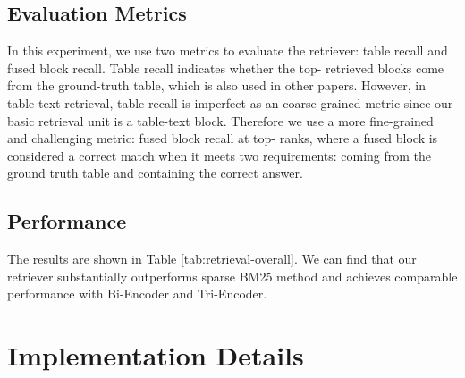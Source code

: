 \documentclass[11pt]{article}
\begin{document}
\subsection{Evaluation Metrics}
In this experiment, we use two metrics to evaluate the retriever: table recall and fused block recall. 
Table recall indicates whether the top- retrieved blocks come from the ground-truth table, which is also used in other papers.
However, in table-text retrieval, table recall is imperfect as an coarse-grained metric since our basic retrieval unit is a table-text block.
Therefore we use a more fine-grained and challenging  metric:  fused  block  recall  at top- ranks, where a fused block is considered a correct match when it meets two requirements: coming from the ground truth table and containing the correct answer. 

\subsection{Performance}
The results are shown in Table \ref{tab:retrieval-overall}. We can find that our retriever substantially outperforms sparse BM25 method and achieves comparable performance with Bi-Encoder and Tri-Encoder.




\begin{table}[htbp]
\small
  \centering
  \caption{Overall retrieval results on OTT-QA dev set. Table recalls and fused block recalls are reported.}
  \label{tab:retrieval-overall}
\end{table}





\section{Implementation Details}
\label{appendix:detail}
\end{document}
